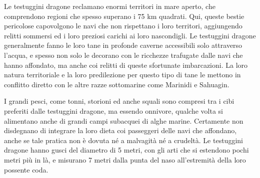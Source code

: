 \begin{multicols}{2}
	Le testuggini dragone reclamano enormi territori in mare aperto, che comprendono regioni che spesso superano i 75 km quadrati. Qui, queste bestie pericolose capovolgono le navi che non rispettano i loro territori, aggiungendo relitti sommersi ed i loro preziosi carichi ai loro nascondigli. Le testuggini dragone generalmente fanno le loro tane in profonde caverne accessibili solo attraverso l'acqua, e spesso non solo le decorano con le ricchezze trafugate dalle navi che hanno affondato, ma anche coi relitti di queste sfortunate imbarcazioni. La loro natura territoriale e la loro predilezione per questo tipo di tane le mettono in conflitto diretto con le altre razze sottomarine come Marinidi e Sahuagin.

	I grandi pesci, come tonni, storioni ed anche squali sono compresi tra i cibi preferiti dalle testuggini dragone, ma essendo onnivore, qualche volta si alimentano anche di grandi campi subacquei di alghe marine. Certamente non disdegnano di integrare la loro dieta coi passeggeri delle navi che affondano, anche se tale pratica non è dovuta né a malvagità né a crudeltà. Le testuggini dragone hanno gusci del diametro di 5 metri, con gli arti che si estendono pochi metri più in là, e misurano 7 metri dalla punta del naso all'estremità della loro possente coda.


\end{multicols}
